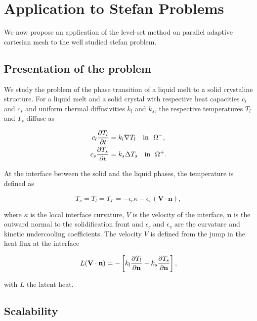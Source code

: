 \section{Application to Stefan Problems}

We now propose an application of the level-set method on parallel adaptive cartesian mesh to the well studied stefan problem.

\subsection{Presentation of the problem}

We study the problem of the phase transition of a liquid melt to a solid crystaline structure. For a liquid melt and a solid crystal with respective heat capacities $c_l$ and $c_s$ and uniform thermal diffusivities $k_l$ and $k_s$, the respective temperatures $T_l$ and $T_s$ diffuse as

\begin{align*}
c_l \frac{\partial T_l}{\partial t} & = k_l \nabla T_l \quad \mathrm{in} ~~ \Omega^- , \\
c_s \frac{\partial T_s}{\partial t} & = k_s \Delta T_s \quad \mathrm{in} ~~ \Omega^+ .
\end{align*}

At the interface between the solid and the liquid phases, the temperature is defined as

\begin{equation*}
T_s = T_l = T_{\Gamma} = -\epsilon_c \kappa - \epsilon_v (\mathbf{V} \cdot \mathbf{n}),
\end{equation*}

where $\kappa$ is the local interface curvature, $V$ is the velocity of the interface, $\mathbf{n}$ is the outward normal to the solidification front and $\epsilon_c$ and $\epsilon_v$ are the curvature and kinetic undercooling coefficients. The velocity $V$ is defined from the jump in the heat flux at the interface

\begin{equation}
L (\mathbf{V} \cdot \mathbf{n}) = - \left[ k_l \frac{\partial T_l}{\partial \mathbf{n}} - k_s \frac{\partial T_s}{\partial \mathbf{n}} \right],
\end{equation}

with $L$ the latent heat.

\subsection{Scalability}

